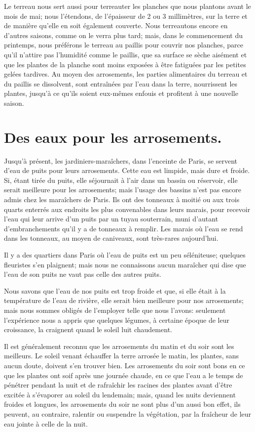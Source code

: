 \documentclass[10pt,a4paper]{book}
\begin{document}
Le terreau nous sert aussi pour terreauter les planches que nous plantons avant le mois de mai; nous l'étendons, de l'épaisseur de 2 ou 3 millimètres, sur la terre et de manière qu'elle en soit également couverte. Nous terreautons encore en d'autres saisons, comme on le verra plus tard; mais, dans le commencement du printemps, nous préférons le terreau au paillis pour couvrir nos planches, parce qu'il n'attire pas l'humidité comme le paillis, que sa surface se sèche aisément et que les plantes de la planche sont moins exposées à être fatiguées par les petites gelées tardives. Au moyen des arrosements, les parties alimentaires du terreau et du paillis se dissolvent, sont entraînées par l'eau dans la terre, nourrissent les plantes, jusqu'à ce qu'ils soient eux-mêmes enfouis et profitent à une nouvelle saison.

\chapter{Des eaux pour les arrosements.}

Jusqu'à présent, les jardiniers-maraîchers, dans l'enceinte de Paris, se servent d'eau de puits pour leurs arrosements. Cette eau est limpide, mais dure et froide. Si, étant tirée du puits, elle séjournait à l'air dans un bassin ou réservoir, elle serait meilleure pour les arrosements; mais l'usage des bassins n'est pas encore admis chez les maraîchers de Paris. Ils ont des tonneaux à moitié ou aux trois quarts enterrés aux endroits les plus convenables dans leurs marais, pour recevoir l'eau qui leur arrive d'un puits par un tuyau souterrain, muni d'autant d'embranchements qu'il y a de tonneaux à remplir. Les marais où l'eau se rend dans les tonneaux, au moyen de caniveaux, sont très-rares aujourd'hui.

Il y a des quartiers dans Paris où l'eau de puits est un peu séléniteuse; quelques fleuristes s'en plaignent; mais nous ne connaissons aucun maraîcher qui dise que l'eau de son puits ne vaut pas celle des autres puits.

Nous savons que l'eau de nos puits est trop froide et que, si elle était à la température de l'eau de rivière, elle serait bien meilleure pour nos arrosements; mais nous sommes obligés de l'employer telle que nous l'avons: seulement l'expérience nous a appris que quelques légumes, à certaine époque de leur croissance, la craignent quand le soleil luit chaudement.

Il est généralement reconnu que les arrosements du matin et du soir sont les meilleurs. Le soleil venant échauffer la terre arrosée le matin, les plantes, sans aucun doute, doivent s'en trouver bien. Les arrosements du soir sont bons en ce que les plantes ont soif après une journée chaude, en ce que l'eau a le temps de pénétrer pendant la nuit et de rafraîchir les racines des plantes avant d'être excitée à s'évaporer au soleil du lendemain; mais, quand les nuits deviennent froides et longues, les arrosements du soir ne sont plus d'un aussi bon effet, ils peuvent, au contraire, ralentir ou suspendre la végétation, par la fraîcheur de leur eau jointe à celle de la nuit.
\end{document}
